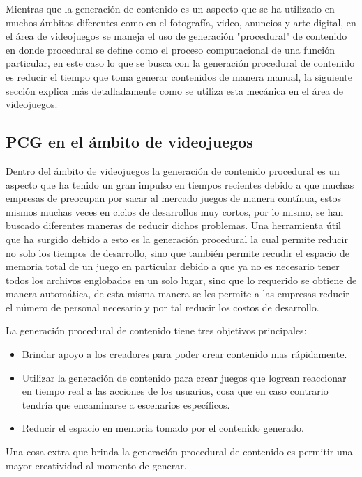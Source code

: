 Mientras que la generación de contenido es un aspecto que se ha utilizado en
muchos ámbitos diferentes como en el fotografía, video, anuncios y arte digital, en
el área de videojuegos se maneja el uso de generación "procedural" de contenido
en donde procedural se define como el proceso computacional de una función
particular, en este caso lo que se busca con la generación procedural de
contenido es reducir el tiempo que toma generar contenidos de manera manual, la
siguiente sección explica más detalladamente como se utiliza esta mecánica en el
área de videojuegos.

\subsection{PCG en el ámbito de videojuegos}
\label{subsection:PCGInGames}

Dentro del ámbito de videojuegos la generación de contenido procedural es un
aspecto que ha tenido un gran impulso en tiempos recientes debido a que muchas
empresas de preocupan por sacar al mercado juegos de manera contínua, estos
mismos muchas veces en ciclos de desarrollos muy cortos, por lo mismo, se han buscado
diferentes maneras de reducir dichos problemas. Una herramienta útil que ha
surgido debido a esto es la generación procedural la cual permite reducir no
solo los tiempos de desarrollo, sino que también permite recudir el espacio de
memoria total de un juego en particular debido a que ya no es necesario tener
todos los archivos englobados en un solo lugar, sino que lo requerido se obtiene
de manera automática, de esta misma manera se les permite a las empresas reducir
el número de personal necesario y por tal reducir los costos de desarrollo.

La generación procedural de contenido tiene tres objetivos %
principales:
\begin{itemize}
    \item Brindar apoyo a los creadores para poder crear contenido mas
    rápidamente.
    \item Utilizar la generación de contenido para crear juegos que logrean
    reaccionar en tiempo real a las acciones de los usuarios, cosa que en caso
    contrario tendría que encaminarse a escenarios específicos.
    \item Reducir el espacio en memoria tomado por el contenido generado.
\end{itemize}
Una cosa extra que brinda la generación procedural de contenido es permitir una
mayor creatividad al momento de generar.

